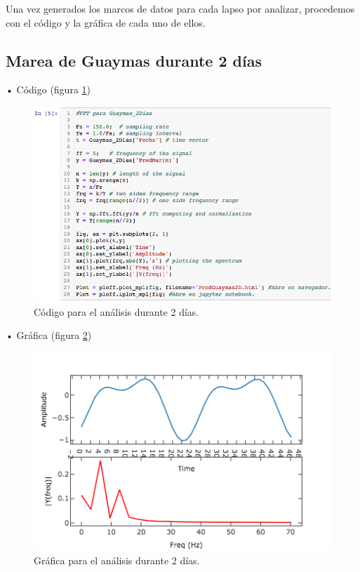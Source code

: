 \documentclass[12pt]{article}
\begin{document}
Una vez generados los marcos de datos para cada lapso por analizar, procedemos con el código y la gráfica de cada uno de ellos.

\subsection{Marea de Guaymas durante 2 días}

\noindent • Código (figura \ref{fig:cod-2d}) \\

\begin{figure}[h!]
	\center
	\includegraphics[scale=.6]{./Images/cod-2d}
	\caption{\label{fig:cod-2d} Código para el análisis durante 2 días.}
\end{figure}

\noindent • Gráfica (figura \ref{fig:graf-2d}) \\

\begin{figure}[h!]
	\center
	\includegraphics[scale=.6]{./Images/graf-2d}
	\caption{\label{fig:graf-2d} Gráfica para el análisis durante 2 días.}
\end{figure}
\end{document}
